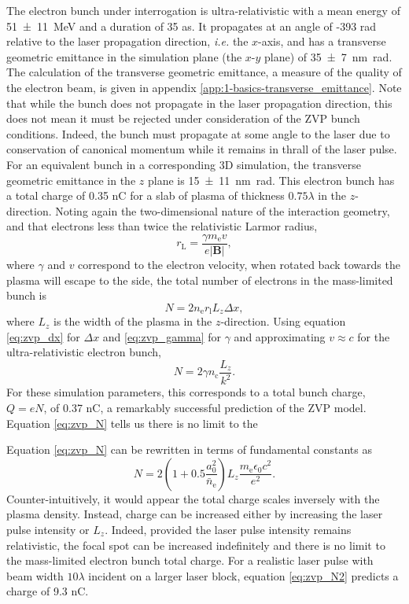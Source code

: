 The electron bunch under interrogation is ultra-relativistic with a mean energy of \qty{51\pm 11}{MeV} and a duration of 35 as. It propagates at an angle of -393 rad relative to the laser propagation direction, \textit{i.e.} the $x$-axis, and has a transverse geometric emittance in the simulation plane (the $x$-$y$ plane) of \qty{35 \pm 7}{nm.rad}. The calculation of the transverse geometric emittance, a measure of the quality of the electron beam, is given in appendix \ref{app:1-basics-transverse_emittance}. Note that while the bunch does not propagate in the laser propagation direction, this does not mean it must be rejected under consideration of the ZVP bunch conditions. Indeed, the bunch must propagate at some angle to the laser due to conservation of canonical momentum while it remains in thrall of the laser pulse. For an equivalent bunch in a corresponding 3D simulation, the transverse geometric emittance in the $z$ plane is \qty{15\pm 11}{nm.rad}. This electron bunch has a total charge of 0.35 nC for a slab of plasma of thickness $0.75\lambda$ in the $z$-direction. Noting again the two-dimensional nature of the interaction geometry, and that electrons less than twice the relativistic Larmor radius, 
\begin{equation}
	r_\mathrm{L} = \frac{\gamma m_\mathrm{e}v}{e|\mathbf{B}|},
\end{equation}
where $\gamma$ and $v$ correspond to the electron velocity, when rotated back towards the plasma will escape to the side, the total number of electrons in the mass-limited bunch is
\begin{equation}
	N = 2 n_\mathrm{e} r_\mathrm{l} L_z \Delta x,
\end{equation}
where $L_z$ is the width of the plasma in the $z$-direction. Using equation \ref{eq:zvp_dx} for $\Delta x$ and \ref{eq:zvp_gamma} for $\gamma$ and approximating $v \approx c$ for the ultra-relativistic electron bunch, 
\begin{equation}\label{eq:zvp_N}
	N = 2 \gamma n_\mathrm{c} \frac{L_z}{k^2}.
\end{equation}
For these simulation parameters, this corresponds to a total bunch charge, $Q = eN$, of 0.37 nC, a remarkably successful prediction of the ZVP model. Equation \ref{eq:zvp_N} tells us there is no limit to the 

Equation \ref{eq:zvp_N} can be rewritten in terms of fundamental constants as
\begin{equation}\label{eq:zvp_N2}
	N = 2 (1+0.5\frac{a^2_0}{\bar{n}_\mathrm{e}}) L_z \frac{m_\mathrm{e}\epsilon_0c^2}{e^2}.
\end{equation}
Counter-intuitively, it would appear the total charge scales inversely with the plasma density. Instead, charge can be increased either by increasing the laser pulse intensity or $L_z$. Indeed, provided the laser pulse intensity remains relativistic, the focal spot can be increased indefinitely and there is no limit to the mass-limited electron bunch total charge. For a realistic laser pulse with beam width $10 \lambda$ incident on a larger laser block, equation \ref{eq:zvp_N2} predicts a charge of 9.3 nC.

